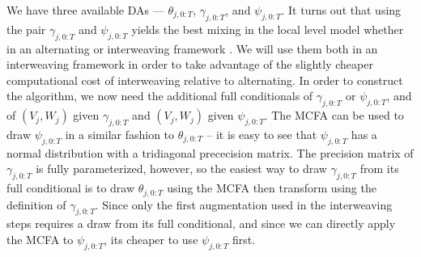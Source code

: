 \documentclass[graybox]{svmult}
\begin{document}
We have three available DAs --- $\theta_{j,0:T}$, $\gamma_{j,0:T}$, and $\psi_{j,0:T}$. It turns out that using the pair $\gamma_{j,0:T}$ and $\psi_{j,0:T}$ yields the best mixing in the local level model whether in an alternating or interweaving framework \citep{simpson2014interweaving}. We will use them both in an interweaving framework in order to take advantage of the slightly cheaper computational cost of interweaving relative to alternating. In order to construct the algorithm, we now need the additional full conditionals of $\gamma_{j,0:T}$ or $\psi_{j,0:T}$, and of $(V_j,W_j)$ given $\gamma_{j,0:T}$ and $(V_j,W_j)$ given $\psi_{j,0:T}$. The MCFA can be used to draw $\psi_{j,0:T}$ in a similar fashion to $\theta_{j,0:T}$ -- it is easy to see that $\psi_{j,0:T}$ has a normal distribution with a tridiagonal prececision matrix. The precision matrix of $\gamma_{j,0:T}$ is fully parameterized, however, so the easiest way to draw $\gamma_{j,0:T}$ from its full conditional is to draw $\theta_{j,0:T}$ using the MCFA then transform using the definition of $\gamma_{j,0:T}$. Since only the first augmentation used in the interweaving steps requires a draw from its full conditional, and since we can directly apply the MCFA to $\psi_{j,0:T}$, its cheaper to use $\psi_{j,0:T}$ first. 
\end{document}
